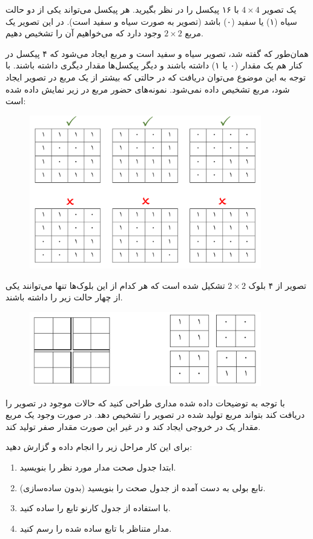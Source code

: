 یک تصویر $4\times 4 $ با ۱۶ پیکسل را در نظر بگیرید. هر پیکسل می‌تواند یکی از دو حالت سیاه (۱) یا سفید (۰) باشد (تصویر به صورت سیاه و سفید است). در این تصویر یک مربع $2 \times 2 $ وجود دارد که می‌خواهیم آن را تشخیص دهیم.

همان‌طور که گفته شد، تصویر سیاه و سفید است و مربع ایجاد می‌شود که ۴ پیکسل در کنار هم یک مقدار (۰ یا ۱) داشته باشند و دیگر پیکسل‌ها مقدار دیگری داشته باشند. با توجه به این موضوع می‌توان دریافت که در حالتی که بیشتر از یک مربع در تصویر ایجاد شود، مربع تشخیص داده نمی‌شود. نمونه‌های حضور مربع در زیر نمایش داده شده است:


\begin{figure}[h]
	\centering
	\includegraphics[width=0.9\textwidth]{fig/img4.png}
	\label{img4}
\end{figure}


تصویر از ۴ بلوک $2 \times 2 $  تشکیل شده است که هر کدام از این بلوک‌ها تنها می‌توانند یکی از چهار حالت
 زیر را داشته باشند.
 
 
 \begin{figure}[h]
 	\centering
 	\includegraphics[width=0.9\textwidth]{fig/img5.png}
 	\label{img5}
 \end{figure}
 
 با توجه به توضیحات داده شده مداری طراحی کنید که حالات موجود در تصویر را دریافت کند بتواند مربع تولید شده در تصویر را تشخیص دهد. در صورت وجود یک مربع مقدار یک در خروجی ایجاد کند و در غیر این صورت مقدار صفر تولید کند.
 
 برای این کار مراحل زیر را انجام داده و گزارش دهید:
 
 \begin{enumerate}
 	\item ابتدا جدول صحت مدار مورد نظر را بنویسید.
 	\item تابع بولی به دست آمده از جدول صحت را بنویسید (بدون ساده‌سازی).
 	\item با استفاده از جدول کارنو تابع را ساده کنید.
 	\item مدار متناظر با تابع ساده شده را رسم کنید.
 \end{enumerate}